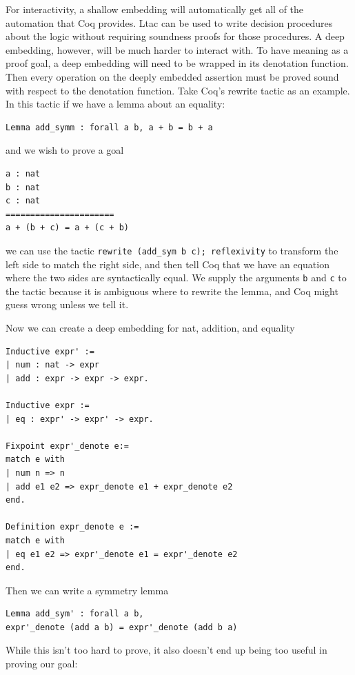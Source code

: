 \documentclass{puthesis}
\begin{document}
For interactivity, a shallow embedding will automatically get all of
the automation that Coq provides. Ltac can be used to write decision
procedures about the logic without requiring soundness proofs for
those procedures. A deep embedding, however, will be much harder to
interact with. To have meaning as a proof goal, a deep embedding will
need to be wrapped in its denotation function. Then every operation on
the deeply embedded assertion must be proved sound with respect to the
denotation function. Take Coq's rewrite tactic as an example. In this
tactic if we have a lemma about an equality:

\begin{verbatim}
Lemma add_symm : forall a b, a + b = b + a
\end{verbatim}

and we wish to prove a goal 

\begin{verbatim}
a : nat
b : nat
c : nat
======================
a + (b + c) = a + (c + b) 
\end{verbatim}

we can use the tactic \lstinline|rewrite (add_sym b c); reflexivity|
to transform the left side to match the right side, and then tell Coq
that we have an equation where the two sides are syntactically
equal. We supply the arguments \lstinline|b| and \lstinline|c| to the
tactic because it is ambiguous where to rewrite the lemma, and Coq
might guess wrong unless we tell it.

Now we can create a deep embedding for nat, addition, and equality

\begin{verbatim}
Inductive expr' :=
| num : nat -> expr
| add : expr -> expr -> expr.

Inductive expr :=
| eq : expr' -> expr' -> expr.

Fixpoint expr'_denote e:=
match e with
| num n => n
| add e1 e2 => expr_denote e1 + expr_denote e2
end.

Definition expr_denote e :=
match e with
| eq e1 e2 => expr'_denote e1 = expr'_denote e2
end.
\end{verbatim} 

Then we can write a symmetry lemma

\begin{verbatim}
Lemma add_sym' : forall a b, 
expr'_denote (add a b) = expr'_denote (add b a)
\end{verbatim}

While this isn't too hard to prove, it also doesn't end up being too
useful in proving our goal:
\end{document}
